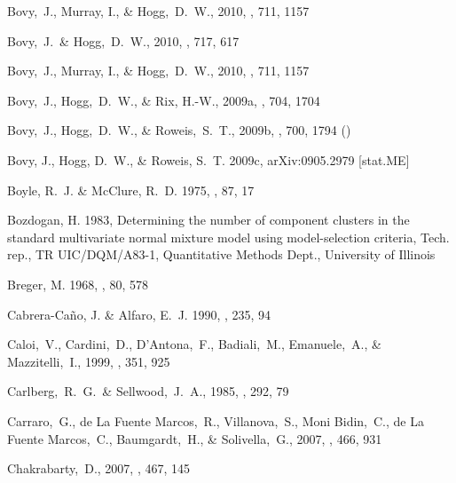 \begin{thebibliography}{99}
 Bovy,~J., Murray, I., \& Hogg,~D.~W., 2010,
  \apj, 711, 1157

 Bovy,~J.~\& Hogg,~D.~W., 2010,
  \apj, 717, 617

 Bovy,~J., Murray, I., \& Hogg,~D.~W., 2010,
  \apj, 711, 1157

  Bovy,~J., Hogg,~D.~W., \& Rix, H.-W., 2009a,
  \apj, 704, 1704

  Bovy,~J., Hogg,~D.~W., \& Roweis,~S.~T., 2009b,
  \apj, 700, 1794 (\bhr)

{Bovy}, J., {Hogg}, D.~W., \& {Roweis}, S.~T. 2009c, {arXiv:0905.2979 [stat.ME]}

{Boyle}, R.~J. \& {McClure}, R.~D. 1975, \pasp, 87, 17

{Bozdogan}, H. 1983, {Determining the number of component clusters in the
  standard multivariate normal mixture model using model-selection criteria},
  Tech. rep., {TR UIC/DQM/A83-1, Quantitative Methods Dept., University of
  Illinois}

{Breger}, M. 1968, \pasp, 80, 578

{Cabrera-Ca\~{n}o}, J. \& {Alfaro}, E.~J. 1990, \aap, 235, 94

  Caloi,~V., Cardini,~D., D'Antona,~F., Badiali,~M., Emanuele,~A., \& Mazzitelli,~I., 1999,
  \aap, 351, 925

  Carlberg,~R.~G.~\& Sellwood,~J.~A., 1985,
  \apj, 292, 79

  Carraro,~G., de La Fuente Marcos,~R., Villanova,~S., Moni Bidin,~C., de La Fuente Marcos,~C., Baumgardt,~H., \& Solivella,~G., 2007,
  \aap, 466, 931

  Chakrabarty,~D., 2007,
  \aap, 467, 145


\end{thebibliography}

